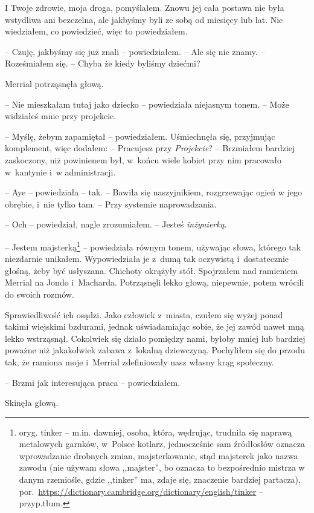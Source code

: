 \documentclass[oneside,polish,11pt,sfheadings]{mwbk}
\begin{document}
I Twoje zdrowie, moja droga, pomyślałem. Znowu jej cała postawa nie była
wstydliwa ani bezczelna, ale jakbyśmy byli ze sobą od miesięcy lub lat.
Nie wiedziałem, co powiedzieć, więc to powiedziałem.

-- Czuję, jakbyśmy się już znali -- powiedziałem. -- Ale się nie znamy. -- Roześmiałem się. -- Chyba że kiedy byliśmy dziećmi?

Merrial potrząsnęła głową. 

-- Nie mieszkałam tutaj jako dziecko -- powiedziała niejasnym tonem. -- Może widziałeś mnie przy projekcie.

-- Myślę, żebym zapamiętał -- powiedziałem. Uśmiechnęła się, przyjmując
komplement, więc dodałem: -- Pracujesz przy \textit{Projekcie}? -- Brzmiałem
bardziej zaskoczony, niż powinienem był, w~końcu wiele kobiet przy nim
pracowało w~kantynie i~w administracji.

-- Aye -- powiedziała -- tak. -- Bawiła się naszyjnikiem, rozgrzewając ogień
w jego obrębie, i~nie tylko tam. -- Przy systemie naprowadzania.

-- Och -- powiedział, nagle zrozumiałem. -- Jesteś \textit{inżynierką}.

-- Jestem majsterką\footnote{ oryg. tinker -- m.in. dawniej, osoba, która,
wędrując, trudniła się naprawą metalowych garnków, w~Polsce
kotlarz, jednocześnie sam źródłosłów oznacza wprowadzanie drobnych zmian,
majsterkowanie, stąd majsterek jako nazwa zawodu (nie używam słowa ,,majster'', bo 
oznacza to bezpośrednio mistrza w danym rzemiośle, gdzie ,,tinker'' ma, zdaje się, znaczenie bardziej partacza), por.~\url{https://dictionary.cambridge.org/dictionary/english/tinker} -- przyp.tłum.} -- powiedziała równym tonem, używając słowa, którego tak
niezdarnie unikałem. Wypowiedziała je z~dumą tak oczywistą i~dostatecznie głośną, żeby być usłyszana. Chichoty okrążyły stół.
Spojrzałem nad ramieniem Merrial na Jondo i~Macharda. Potrząsnęli lekko
głową, niepewnie, potem wrócili do swoich rozmów.

Sprawiedliwość ich osądzi. Jako człowiek z~miasta, czułem się wyżej
ponad takimi wiejskimi bzdurami, jednak uświadamiając sobie, że jej
zawód nawet mną lekko wstrząsnął. Cokolwiek się działo pomiędzy nami,
byłoby mniej lub bardziej poważne niż jakakolwiek zabawa z~lokalną
dziewczyną. Pochyliłem się do przodu tak, że ramiona moje i~Merrial
zdefiniowały nasz własny krąg społeczny.

-- Brzmi jak interesująca praca -- powiedziałem.

Skinęła głową. 
\end{document}
